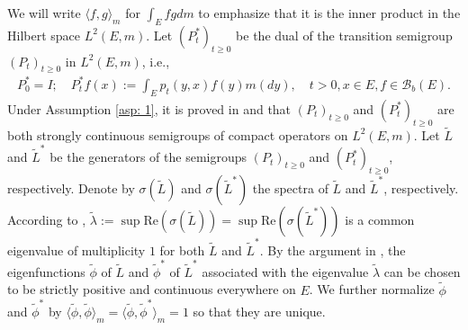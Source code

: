 \documentclass[12pt,a4paper]{amsart}
\theoremstyle{definition}
\numberwithin{equation}{section}
\begin{document}
We will write $\langle f, g\rangle_m$ for $\int_E fg dm$ to emphasize that it is the inner product in the Hilbert space $L^2(E, m)$.
Let $(P_t^*)_{t\geq 0}$ be the dual of the transition semigroup $(P_t)_{t\geq 0}$ in $L^2(E, m)$, i.e.,
\begin{align}
  P_0^* = I;
  \quad P_t^* f(x) := \int_E p_t(y,x) f(y) m(dy),
  \quad t > 0, x\in E, f\in \mathscr B_b(E).
\end{align}
Under Assumption \ref{asp: 1}, it is proved in \cite{RenSongZhang2015Limit} and \cite{RenSongZhang2017Central} that $(P_t)_{t \geq 0}$ and $(P^*_t)_{t \geq 0}$ are both strongly continuous semigroups of compact operators on $L^2(E,m)$.
Let $\widetilde L$ and $\widetilde L^*$ be the generators of the semigroups $(P_t)_{t \geq 0}$ and $(P^*_t)_{t \geq 0}$, respectively.
Denote by $\sigma(\widetilde L)$ and $\sigma(\widetilde L^*)$ the spectra of $\widetilde L$ and $\widetilde L^*$, respectively.
According to \cite[Theorem V.6.6]{Schaefer1974Banach},
$\widetilde \lambda := \sup \text{Re}(\sigma(\widetilde L)) = \sup \text{Re}(\sigma(\widetilde L^*))$ is a common eigenvalue of multiplicity $1$ for both $\widetilde L$ and $\widetilde L^*$.
By the argument in \cite{RenSongZhang2015Limit},
the eigenfunctions $\widetilde \phi$ of $\widetilde L$ and $\widetilde \phi^*$ of $\widetilde L^*$ associated with the eigenvalue $\widetilde \lambda$ can be chosen to be strictly positive and continuous everywhere on $E$.
We further normalize $\widetilde \phi$ and $\widetilde \phi^*$ by $\big\langle \widetilde \phi, \widetilde \phi \big\rangle_m = \big\langle \widetilde \phi, \widetilde \phi^*\big\rangle_m = 1$ so that they are unique.
\end{document}
